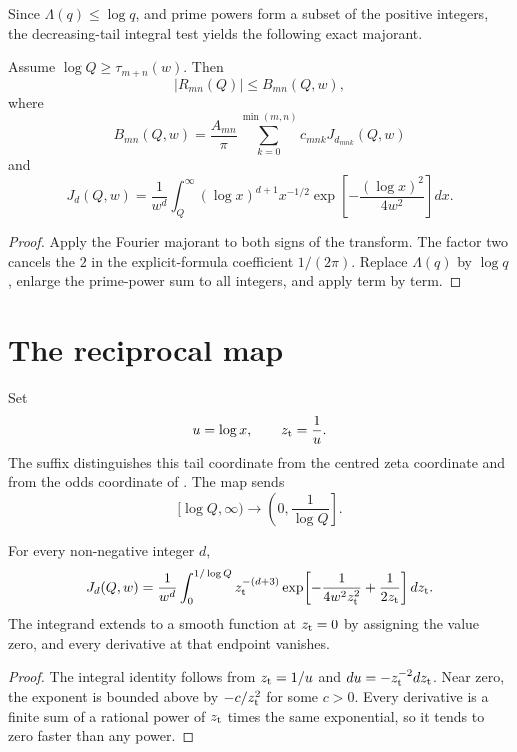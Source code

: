 Since $\Lambda(q)\le\log q$, and prime powers form a subset of the positive
integers, the decreasing-tail integral test yields the following exact
majorant.

\begin{theorem}
\label{thm:prime-tail-entry-certificate}
Assume $\log Q\ge\tau_{m+n}(w)$. Then
\[
 |R_{mn}(Q)|\le B_{mn}(Q,w),
\]
where
\[
 B_{mn}(Q,w)=\frac{A_{mn}}{\pi}
 \sum_{k=0}^{\min(m,n)}c_{mnk}J_{d_{mnk}}(Q,w)
\]
and
\[
 J_d(Q,w)=\frac1{w^d}\int_Q^\infty
 (\log x)^{d+1}x^{-1/2}
 \exp\!\left[-\frac{(\log x)^2}{4w^2}\right]dx.
\]
\end{theorem}

\begin{proof}
Apply the Fourier majorant to both signs of the transform. The factor two
cancels the $2$ in the explicit-formula coefficient $1/(2\pi)$. Replace
$\Lambda(q)$ by $\log q$, enlarge the prime-power sum to all integers, and
apply  term by term.
\end{proof}

\section{The reciprocal map}

Set
\[
 u=\log x,
 \qquad
 z_{\rm t}=\frac1u.
\]
The suffix distinguishes this tail coordinate from the centred zeta coordinate
and from the odds coordinate of . The map sends
\[
 [\log Q,\infty)
 \longrightarrow
 \left(0,\frac1{\log Q}\right].
\]

\begin{theorem}
\label{thm:tail-reciprocal-compactification}
For every non-negative integer $d$,
\[
J_d(Q,w)=\frac1{w^d}
\int_0^{1/\log Q}
 z_{\rm t}^{-(d+3)}
\exp\!\left[-\frac1{4w^2z_{\rm t}^2}+\frac1{2z_{\rm t}}\right]
 dz_{\rm t}.
\]
The integrand extends to a smooth function at $z_{\rm t}=0$ by assigning the
value zero, and every derivative at that endpoint vanishes.
\end{theorem}

\begin{proof}
The integral identity follows from $z_{\rm t}=1/u$ and
$du=-z_{\rm t}^{-2}dz_{\rm t}$. Near zero, the exponent is bounded above by
$-c/z_{\rm t}^2$ for some $c>0$. Every derivative is a finite sum of a
rational power of $z_{\rm t}$ times the same exponential, so it tends to zero
faster than any power.
\end{proof}

